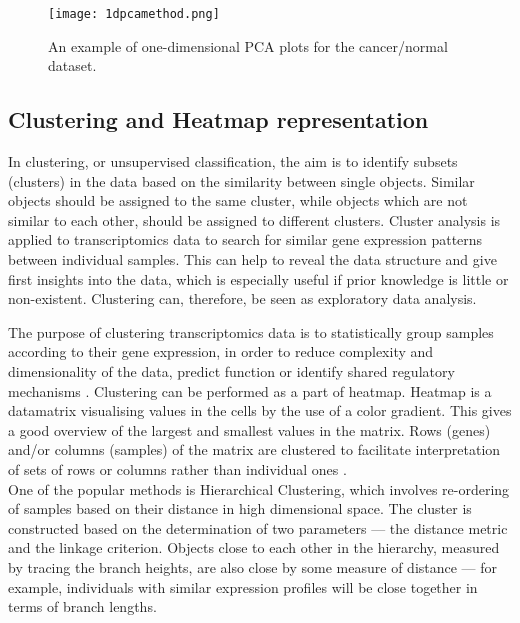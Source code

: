     
            \begin{figure}[h]
            \centering
            \texttt{[image: 1dpcamethod.png]}
            \caption{An example of one-dimensional PCA plots for the cancer/normal dataset. }
            \label{fig:1dpcamethod}
            \end{figure}
   
  
  
    \subsection{Clustering and Heatmap representation}
    
    In clustering, or unsupervised classification, the aim is to identify subsets (clusters) in the data based on the similarity between single objects. Similar objects should be assigned to the same cluster, while objects which are not similar to each other, should be assigned to different clusters.
    Cluster analysis is applied to transcriptomics data to search for similar gene expression patterns between individual samples. This can help to reveal the data structure and give first insights into the data, which is especially useful if prior knowledge is little or non-existent. Clustering can, therefore, be seen as exploratory data analysis. 
        
    The purpose of clustering transcriptomics data is to statistically group samples according to their gene expression, in order to reduce complexity and dimensionality of the data, predict function or identify shared regulatory mechanisms \cite{Metsalu2015ClustVis:Heatmap}. Clustering can be performed as a part of heatmap. Heatmap is a datamatrix visualising values in the cells by the use of a color gradient. This gives a good overview of the largest and smallest values in the matrix. Rows (genes) and/or columns (samples) of the matrix are clustered to facilitate interpretation of sets of rows or columns rather than individual ones \cite{Metsalu2015ClustVis:Heatmap}.\\

    One of the popular methods is Hierarchical Clustering, which involves re-ordering of samples based on their distance in high dimensional space. The cluster is constructed based on the determination of two parameters — the distance metric and the linkage criterion. Objects close to each other in the hierarchy, measured by tracing the branch heights, are also close by some measure of distance — for example, individuals with similar expression profiles will be close together in terms of branch lengths.
    

